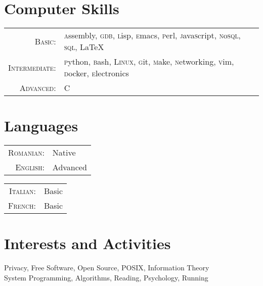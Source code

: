 \documentclass[a4paper,10pt]{article}
\begin{document}
\section{Computer Skills}
\begin{tabular}{rl}
\textsc{Basic:}&
  \textsc{a}ssembly, 
  \textsc{gdb}, \textsc{l}isp, \textsc{e}macs, 
  \textsc{p}erl, \textsc{j}ava\textsc{s}cript, 
  \textsc{n}o\textsc{sql}, \textsc{sql}, \LaTeX\\
\textsc{Intermediate:}&
  \textsc{p}ython, \textsc{b}ash, \textsc{Linux},
  \textsc{g}it, \textsc{m}ake, \textsc{n}etworking, 
  \textsc{v}im, \textsc{d}ocker, \textsc{e}lectronics\\ 
\textsc{Advanced}:&\textsc{C}\\

\end{tabular}


\section{Languages}
\begin{multicols}{2}
  \begin{tabular}{rl}
    \textsc{Romanian:}&Native\\
    \textsc{English:}&Advanced\\
  \end{tabular}
  \columnbreak
  \begin{tabular}{rl}
    \textsc{Italian:}&Basic\\
    \textsc{French:}&Basic\\
  \end{tabular}
\end{multicols}

\section{Interests and Activities}
Privacy, Free Software, Open Source, POSIX, Information Theory\\
System Programming, Algorithms, Reading, Psychology, Running\\
\end{document}
